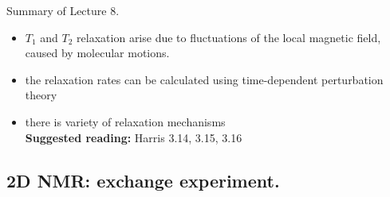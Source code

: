 \documentclass{beamer}
\begin{document}
\begin{frame}{Summary of Lecture 8.}
    \begin{itemize}
    	\item $T_1$ and $T_2$ relaxation arise due to fluctuations of the local magnetic field, caused by molecular motions.
    	\item the relaxation rates can be calculated using time-dependent perturbation theory
    	\item there is variety of relaxation mechanisms \\
        \textbf{Suggested reading:} Harris 3.14, 3.15, 3.16
    \end{itemize}
\end{frame}

\subsection{2D NMR: exchange experiment.}
\end{document}

